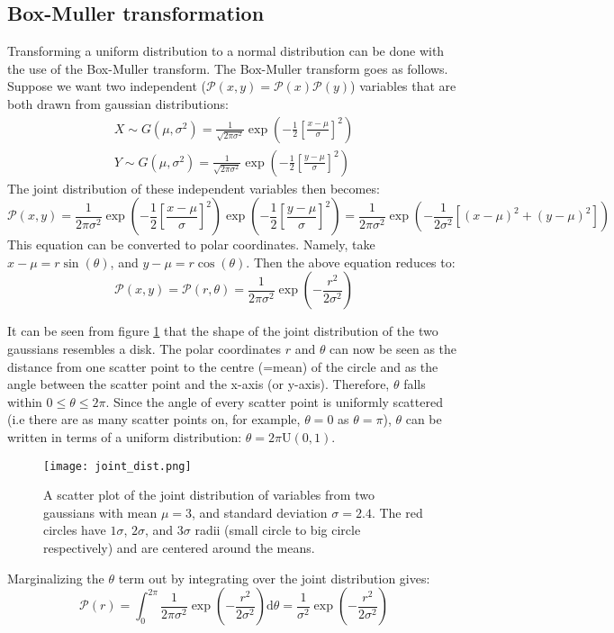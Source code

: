\subsection{Box-Muller transformation}
Transforming a uniform distribution to a normal distribution can be done with the use of the Box-Muller transform. The Box-Muller transform goes as follows. Suppose we want two independent ($\mathcal{P}(x,y) = \mathcal{P}(x)\mathcal{P}(y)$) variables that are both drawn from gaussian distributions:
\begin{gather*}
X \sim G(\mu,\sigma^2) = \frac{1}{\sqrt{2\pi\sigma^2}}\exp\left(-\frac{1}{2}\left[\frac{x-\mu}{\sigma}\right]^2\right)\\
Y \sim G(\mu,\sigma^2) = \frac{1}{\sqrt{2\pi\sigma^2}}\exp\left(-\frac{1}{2}\left[\frac{y-\mu}{\sigma}\right]^2\right)\
\end{gather*}
The joint distribution of these independent variables then becomes:
\begin{equation*}
\mathcal{P}(x,y) = \frac{1}{2\pi\sigma^2}\exp\left(-\frac{1}{2}\left[\frac{x-\mu}{\sigma}\right]^2\right)\exp\left(-\frac{1}{2}\left[\frac{y-\mu}{\sigma}\right]^2\right) = \frac{1}{2\pi\sigma^2}\exp\left(-\frac{1}{2\sigma^2}\left[(x-\mu)^2 + (y-\mu)^2\right]\right)
\end{equation*}
This equation can be converted to polar coordinates. Namely, take $x-\mu = r\sin(\theta)$, and $y - \mu = r\cos(\theta)$. Then the above equation reduces to:
\begin{equation*}
\mathcal{P}(x,y) = \mathcal{P}(r,\theta) = \frac{1}{2\pi\sigma^2}\exp\left(-\frac{r^2}{2\sigma^2}\right)
\end{equation*}

It can be seen from figure \ref{joint_dist} that the shape of the joint distribution of the two gaussians resembles a disk. The polar coordinates $r$ and $\theta$ can now be seen as the distance from one scatter point to the centre (=mean) of the circle and as the angle between the scatter point and the x-axis (or y-axis). Therefore, $\theta$ falls within $0 \leq \theta \leq 2\pi$. Since the angle of every scatter point is uniformly scattered (i.e there are as many scatter points on, for example, $\theta = 0$ as $\theta = \pi$), $\theta$ can be written in terms of a uniform distribution: $\theta = 2\pi \mathrm{U}(0,1)$.

\begin{figure}[h]
\centering
\texttt{[image: joint\_dist.png]}
\caption{A scatter plot of the joint distribution of variables from two gaussians with mean $\mu = 3$, and standard deviation $\sigma = 2.4$. The red circles have $1\sigma$, $2\sigma$, and $3\sigma$ radii (small circle to big circle respectively) and are centered around the means. }
\label{joint_dist}
\end{figure}
Marginalizing the $\theta$ term out by integrating over the joint distribution gives:
\begin{equation*}
\mathcal{P}(r) = \int_0^{2\pi} \frac{1}{2\pi\sigma^2}\exp\left(-\frac{r^2}{2\sigma^2}\right) \mathrm{d}\theta = \frac{1}{\sigma^2} \exp\left(-\frac{r^2}{2\sigma^2}\right)
\end{equation*}

